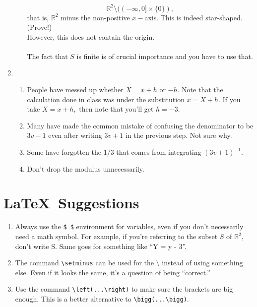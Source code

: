 \documentclass{article}
\begin{document}
\begin{enumerate}[label = Q.\arabic*.]
\begin{enumerate}
		\[\mathbb{R}^2 \setminus ((-\infty, 0]\times\{0\}),\]
		that is, $\mathbb{R}^2$ minus the non-positive $x-$axis. This is indeed star-shaped. (Prove!)\\
		However, this does not contain the origin.\\\\
		The fact that $S$ is finite is of crucial importance and you have to use that.
	\end{enumerate}
	\item 
	\begin{enumerate} 
		\item People have messed up whether $X = x + h$ or $-h.$ Note that the calculation done in class was under the substitution $x = X + h.$ If you take $X = x + h,$ then note that you'll get $h = -3.$
		\item Many have made the common mistake of confusing the denominator to be $3v - 1$ even after writing $3v + 1$ in the previous step. Not sure why.
		\item Some have forgotten the $1/3$ that comes from integrating $(3v + 1)^{-1}.$
		\item Don't drop the modulus unnecessarily.
	\end{enumerate}
\end{enumerate}

\section{\LaTeX\ Suggestions}
\begin{enumerate} 
	\item Always use the \verb+$ $+ environment for variables, even if you don't necessarily need a math symbol. For example, if you're referring to the subset $S$ of $\mathbb{R}^2,$ don't write S. Same goes for something like ``Y = y - 3''.
	\item The command \verb+\setminus+ can be used for the $\setminus$ instead of using something else. Even if it looks the same, it's a question of being ``correct.''
	\item Use the command \verb+\left(...\right)+ to make sure the brackets are big enough. This is a better alternative to \verb+\bigg(...\bigg)+.
\end{enumerate}
\end{document}
